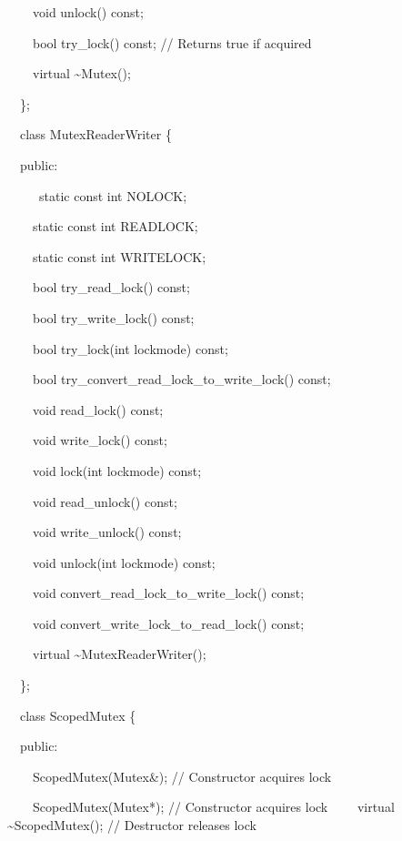 \documentclass[letterpaper]{article}
\begin{document}
{\ttfamily
\ \ \ \ void unlock() const;}

{\ttfamily
\ \ \ \ bool try\_lock() const; // Returns true if acquired}

{\ttfamily
\ \ \ \ virtual \~{}Mutex();}

{\ttfamily
\ \ \};}


\bigskip

{\ttfamily
\ \ class MutexReaderWriter \{}

{\ttfamily
\ \ public:}

{\ttfamily
\ \ \ \ \ static const int NOLOCK;}

{\ttfamily
\ \ \ \ static const int READLOCK;}

{\ttfamily
\ \ \ \ static const int WRITELOCK;}

{\ttfamily
\ \ \ \ bool try\_read\_lock() const;}

{\ttfamily
\ \ \ \ bool try\_write\_lock() const;}

{\ttfamily
\ \ \ \ bool try\_lock(int lockmode) const;}

{\ttfamily
\ \ \ \ bool try\_convert\_read\_lock\_to\_write\_lock() const;}

{\ttfamily
\ \ \ \ void read\_lock() const;}

{\ttfamily
\ \ \ \ void write\_lock() const;}

{\ttfamily
\ \ \ \ void lock(int lockmode) const;}

{\ttfamily
\ \ \ \ void read\_unlock() const;}

{\ttfamily
\ \ \ \ void write\_unlock() const;}

{\ttfamily
\ \ \ \ void unlock(int lockmode) const;}

{\ttfamily
\ \ \ \ void convert\_read\_lock\_to\_write\_lock() const;}

{\ttfamily
\ \ \ \ void convert\_write\_lock\_to\_read\_lock() const;}

{\ttfamily
\ \ \ \ virtual \~{}MutexReaderWriter();}

{\ttfamily
\ \ \};}


\bigskip

{\ttfamily
\ \ class ScopedMutex \{}

{\ttfamily
\ \ public:}

{\ttfamily
\ \ \ \ ScopedMutex(Mutex\&); // Constructor acquires lock}

{\ttfamily
\ \ \ \ ScopedMutex(Mutex*); // Constructor acquires lock\newline
\ \ \ \ virtual \~{}ScopedMutex(); // Destructor releases lock}
\end{document}
